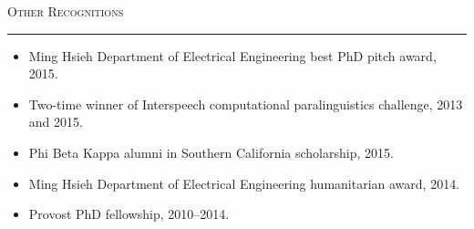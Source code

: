 \documentclass[11pt]{article}
\newcommand{\sectionheading}[1]{%
  \vspace{8pt}%
  {\large\scshape #1}\par\vspace{1pt}\hrule\vspace{3pt}%
}
\begin{document}
\sectionheading{Other Recognitions}
\begin{itemize}
  \item Ming Hsieh Department of Electrical Engineering best PhD pitch award, 2015.
  \item Two-time winner of Interspeech computational paralinguistics challenge, 2013 and 2015.
  \item Phi Beta Kappa alumni in Southern California scholarship, 2015.
  \item Ming Hsieh Department of Electrical Engineering humanitarian award, 2014.
  \item Provost PhD fellowship, 2010--2014.
\end{itemize}
\end{document}
